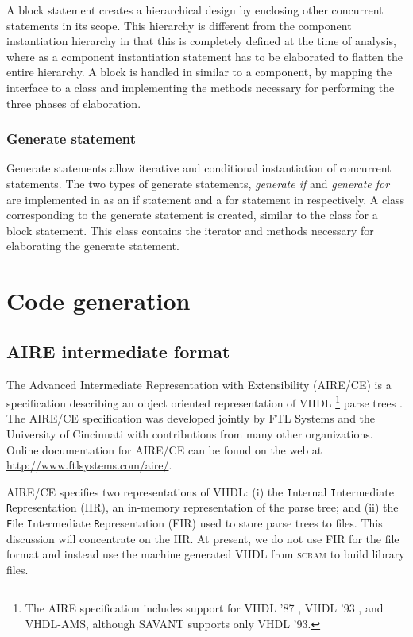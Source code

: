 \documentclass[11pt]{article}
\begin{document}
A block statement creates a hierarchical design by enclosing other
concurrent statements in its scope.  This hierarchy is different from
the component instantiation hierarchy in that this is completely
defined at the time of analysis, where as a component instantiation
statement has to be elaborated to flatten the entire hierarchy.  A
block is handled in \tyvis\/ similar to a component, by mapping the
interface to a class and implementing the methods necessary for
performing the three phases of elaboration.

\subsubsection{Generate statement}
\label{sec:elab_generate}

Generate statements allow iterative and conditional instantiation of
concurrent statements.  The two types of generate statements,
\textit{generate if} and \textit{generate for} are implemented in \tyvis\/
as an if statement and a for statement in \Cpp\/ respectively.  A class
corresponding to the generate statement is created, similar to the class
for a block statement.  This class contains the iterator and methods
necessary for elaborating the generate statement.


\section{Code generation}
\label{chp:code_generation}

\subsection{AIRE intermediate format}
The Advanced Intermediate Representation with Extensibility (AIRE/CE) is a
specification describing an object oriented representation of VHDL
\footnote{The AIRE specification includes support for VHDL '87
\cite{vhdl-lrm-88}, VHDL '93 \cite{vhdl-lrm-93}, and VHDL-AMS, although
SAVANT supports only VHDL '93.} parse trees
\cite{willis-96,wilsey-96-viuf}.  The AIRE/CE specification was developed
jointly by FTL Systems and the University of Cincinnati with contributions
from many other organizations.  Online documentation for AIRE/CE can be
found on the web at \url{http://www.ftlsystems.com/aire/}.

AIRE/CE specifies two representations of VHDL: (i) the
\texttt{I}nternal \texttt{I}ntermediate  \texttt{R}epresentation
(IIR), an in-memory representation of the parse tree; and (ii) the
\texttt{F}ile \texttt{I}ntermediate \texttt{R}epresentation (FIR) used
to store parse trees to files.  This discussion will concentrate on
the IIR.  At present, we do not use FIR for the file format and
instead use the machine generated VHDL from \textsc{scram} to build
library files. 
\end{document}
